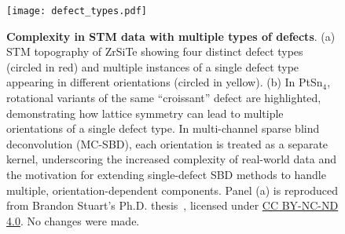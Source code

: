 \begin{figure}
	\texttt{[image: defect\_types.pdf]} 
	\centering
	\caption[\textbf{Complexity in STM data with multiple types of defects}]{\textbf{Complexity in STM data with multiple types of defects}. (a) STM topography of ZrSiTe showing four distinct defect types (circled in red) and multiple instances of a single defect type appearing in different orientations (circled in yellow). 
		(b) In PtSn$_4$, rotational variants of the same ``croissant'' defect are highlighted, demonstrating how lattice symmetry can lead to multiple orientations of a single defect type. 
		In multi-channel sparse blind deconvolution (MC-SBD), each orientation is treated as a separate kernel, underscoring the increased complexity of real-world data and the motivation for extending single-defect SBD methods to handle multiple, orientation-dependent components. 
		Panel (a) is reproduced from Brandon Stuart's Ph.D. thesis~\cite{stuartScanningTunnellingMicroscopy2021}, licensed under 
		\href{https://creativecommons.org/licenses/by-nc-nd/4.0/}{CC BY-NC-ND 4.0}. 
		No changes were made.}
	\label{fig:ch6_defect}
\end{figure}

